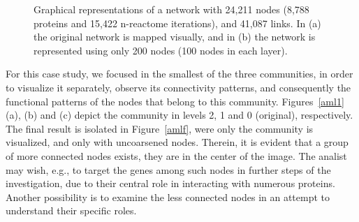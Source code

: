 \documentclass[runningheads]{llncs}
\begin{document}
\begin{figure}[!h]\centering
    \qquad
    \caption{Graphical representations of a network with 24,211 nodes (8,788 proteins and 15,422 n-reactome iterations), and 41,087 links.
    In (a) the original network is mapped visually, and in (b) the network is represented using only 200 nodes (100 nodes in each layer).
    }%
    \label{aml0}%
\end{figure}

For this case study, we focused in the smallest of the three communities,
in order to visualize it separately,
observe its connectivity patterns,
and consequently the functional patterns
of the nodes that belong to this community.
Figures~\ref{aml1} (a), (b) and (c) depict the community in levels 2, 1 and 0 (original), respectively.
The final result is isolated in Figure~\ref{amlf},
were only the community is visualized, and only with uncoarsened nodes.
Therein, it is evident that a group of more connected nodes exists, they are in the center of the image.
The analist may wish, e.g., to target the genes among such nodes
in further steps of the investigation,
due to their central role in interacting with numerous proteins.
Another possibility is to examine the less connected nodes in an attempt
to understand their specific roles.
\end{document}
